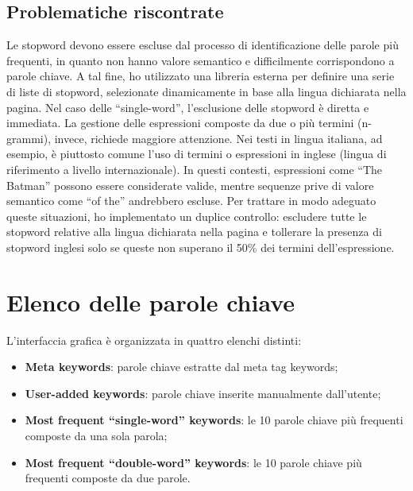 \subsection{Problematiche riscontrate}

\par Le \gls{stopword} devono essere escluse dal processo di identificazione delle parole più frequenti, in quanto non hanno valore semantico e difficilmente corrispondono a parole chiave. A tal fine, ho utilizzato una libreria esterna per definire una serie di liste di stopword, selezionate dinamicamente in base alla lingua dichiarata nella pagina. Nel caso delle “single-word”, l’esclusione delle stopword è diretta e immediata. La gestione delle espressioni composte da due o più termini (n-grammi), invece, richiede maggiore attenzione. Nei testi in lingua italiana, ad esempio, è piuttosto comune l’uso di termini o espressioni in inglese (lingua di riferimento a livello internazionale). In questi contesti, espressioni come “The Batman” possono essere considerate valide, mentre sequenze prive di valore semantico come “of the” andrebbero escluse. Per trattare in modo adeguato queste situazioni, ho implementato un duplice controllo: escludere tutte le stopword relative alla lingua dichiarata nella pagina e tollerare la presenza di stopword inglesi solo se queste non superano il 50\% dei termini dell’espressione.

\section{Elenco delle parole chiave}
\label{sec:keyword-list}

\par L'interfaccia grafica è organizzata in quattro elenchi distinti: 
\begin{itemize}
  \item \textbf{Meta keywords}: parole chiave estratte dal meta tag keywords;
  \item \textbf{User-added keywords}: parole chiave inserite manualmente dall'utente;
  \item \textbf{Most frequent “single-word” keywords}: le 10 parole chiave più frequenti composte da una sola parola;
  \item \textbf{Most frequent “double-word” keywords}: le 10 parole chiave più frequenti composte da due parole.
\end{itemize}

